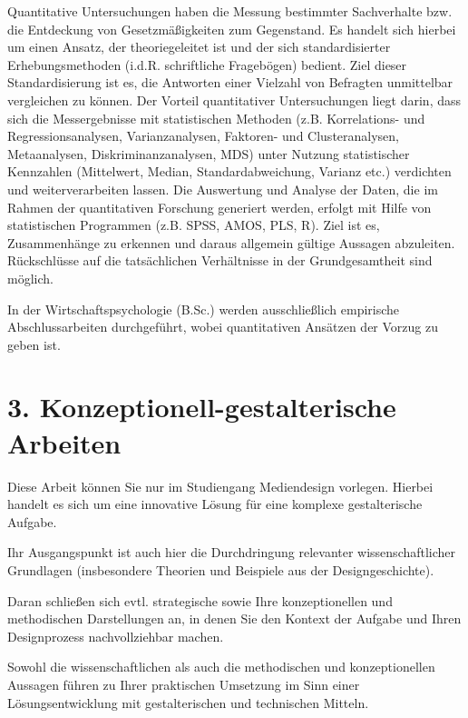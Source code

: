 Quantitative Untersuchungen haben die Messung bestimmter Sachverhalte bzw. die Entdeckung von Gesetzmäßigkeiten zum Gegenstand. Es handelt sich hierbei um einen Ansatz, der theoriegeleitet ist und der sich standardisierter Erhebungsmethoden (i.d.R. schriftliche Fragebögen) bedient. Ziel dieser Standardisierung ist es, die Antworten einer Vielzahl von Befragten unmittelbar vergleichen zu können. Der Vorteil quantitativer Untersuchungen liegt darin, dass sich die Messergebnisse mit statistischen Methoden (z.B. Korrelations- und Regressionsanalysen, Varianzanalysen, Faktoren- und Clusteranalysen, Metaanalysen, Diskriminanzanalysen, MDS) unter Nutzung statistischer Kennzahlen (Mittelwert, Median, Standardabweichung, Varianz etc.) verdichten und weiterverarbeiten lassen. Die Auswertung und Analyse der Daten, die im Rahmen der quantitativen Forschung generiert werden, erfolgt mit Hilfe von statistischen Programmen (z.B. SPSS, AMOS, PLS, R). Ziel ist es, Zusammenhänge zu erkennen und daraus allgemein gültige Aussagen abzuleiten. Rückschlüsse auf die tatsächlichen Verhältnisse in der Grundgesamtheit sind möglich.

In der Wirtschaftspsychologie (B.Sc.) werden ausschließlich empirische Abschlussarbeiten durchgeführt, wobei quantitativen Ansätzen der Vorzug zu geben ist.

\section*{3. Konzeptionell-gestalterische Arbeiten}

Diese Arbeit können Sie nur im Studiengang Mediendesign vorlegen. Hierbei handelt es sich um eine innovative Lösung für eine komplexe gestalterische Aufgabe.

Ihr Ausgangspunkt ist auch hier die Durchdringung relevanter wissenschaftlicher Grundlagen (insbesondere Theorien und Beispiele aus der Designgeschichte).

Daran schließen sich evtl. strategische sowie Ihre konzeptionellen und methodischen Darstellungen an, in denen Sie den Kontext der Aufgabe und Ihren Designprozess nachvollziehbar machen.

Sowohl die wissenschaftlichen als auch die methodischen und konzeptionellen Aussagen führen zu Ihrer praktischen Umsetzung im Sinn einer Lösungsentwicklung mit gestalterischen und technischen Mitteln.